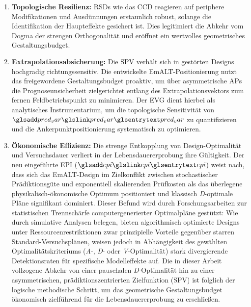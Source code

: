 \begin{enumerate}
    \item \textbf{Topologische Resilienz:} \acp{RSD} wie das \ac{CCD} reagieren auf periphere Modifikationen und Ausdünnungen erstaunlich robust, solange die Identifikation der Haupteffekte gesichert ist. Dies legitimiert die Abkehr vom Dogma der strengen Orthogonalität und eröffnet ein wertvolles geometrisches Gestaltungsbudget.
    \item \textbf{Extrapolationsabsicherung:} Die \ac{SPV} verhält sich in gestörten Designs hochgradig richtungssensitiv.
          Die entwickelte \ac{EmALT}-Positionierung nutzt das freigewordene Gestaltungsbudget proaktiv, um über asymmetrische \acp{AP} die Prognoseunsicherheit zielgerichtet entlang des Extrapolationsvektors zum fernen Feldbetriebspunkt zu minimieren.
          Der \ac{EVG} dient hierbei als analytisches Instrumentarium, um die topologische Sensitivität von $\sym{pred_var}$ zu quantifizieren und die Ankerpunktpositionierung systematisch zu optimieren.
    \item \textbf{Ökonomische Effizienz:} Die strenge Entkopplung von Design-Optimalität und Versuchsdauer verliert in der Lebensdauererprobung ihre Gültigkeit. Der neu eingeführte \ac{EPI} ($\sym{epi}$) weist nach, dass sich das \ac{EmALT}-Design im Zielkonflikt zwischen stochastischer Prädiktionsgüte und exponentiell skalierenden Prüfkosten als das überlegene physikalisch-ökonomische Optimum positioniert und klassisch \textit{D}-optimale Pläne signifikant dominiert.
          Dieser Befund wird durch Forschungsarbeiten zur statistischen Trennschärfe computergenerierter Optimalpläne gestützt:
          Wie \textcite{Rittmaier.2025} durch simulative Analysen belegen, bieten algorithmisch optimierte Designs unter Ressourcenrestriktionen zwar prinzipielle Vorteile gegenüber starren Standard-Versuchsplänen, weisen jedoch in Abhängigkeit des gewählten Optimalitätskriteriums (\textit{A}-, \textit{D}- oder \textit{V}-Optimalität) stark divergierende Detektionsraten für spezifische Modelleffekte auf.
          Die in dieser Arbeit vollzogene Abkehr von einer pauschalen \textit{D}-Optimalität hin zu einer asymmetrischen, prädiktionszentrierten Zielfunktion (\ac{SPV}) ist folglich der logische methodische Schritt, um das geometrische Gestaltungsbudget ökonomisch zielführend für die Lebensdauererprobung zu erschließen.
\end{enumerate}

